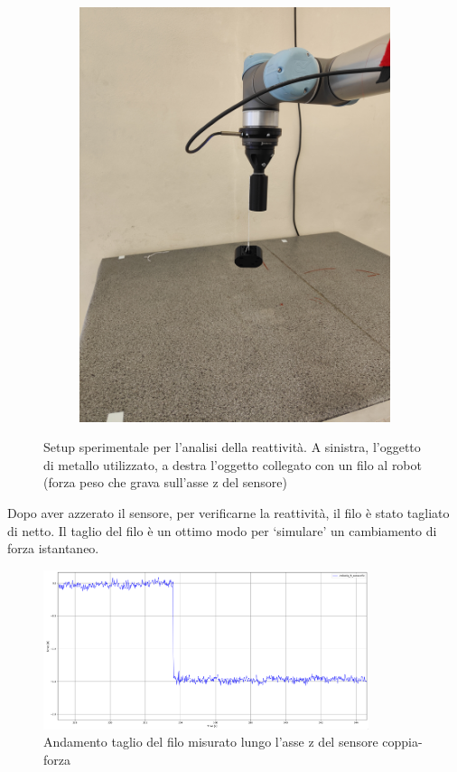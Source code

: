 \begin{figure}[H]
\begin{subfigure}[b]{0.4\textwidth}
        \includegraphics[width=\textwidth]{images/setup_z.jpg}
        \label{fig:setup}
    \end{subfigure}
    \caption{Setup sperimentale per l'analisi della reattivit\`{a}. A sinistra, l'oggetto di metallo utilizzato, 
    a destra l'oggetto collegato con un filo al robot (forza peso che grava sull'asse z del sensore)}\label{fig:setup_z}
\end{figure}
Dopo aver azzerato il sensore, per verificarne la reattivit\`{a}, il filo \`{e} stato tagliato di netto. 
Il taglio del filo \`{e} un ottimo modo per `simulare' un cambiamento di forza istantaneo.
\begin{figure}[H]
    \centering
    \includegraphics*[width=0.85\textwidth]{images/z_cut.png}
    \caption{Andamento taglio del filo misurato lungo l'asse z del sensore coppia-forza}
    \label{fig:z_cut}
\end{figure}
